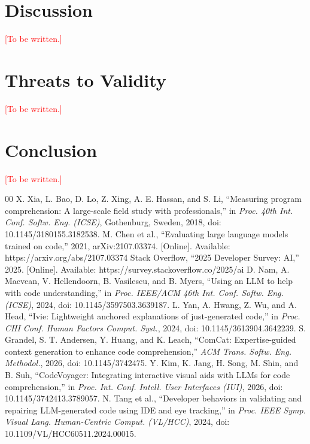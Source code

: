 \documentclass[conference]{IEEEtran}
\newcommand{\todo}[1]{\textcolor{red}{[#1]}}
\begin{document}
\section{Discussion}\label{sec:discussion}
\todo{To be written.}

\section{Threats to Validity}\label{sec:threats}
\todo{To be written.}

\section{Conclusion}\label{sec:conclusion}
\todo{To be written.}

\begin{thebibliography}{00}
 X. Xia, L. Bao, D. Lo, Z. Xing, A. E. Hassan, and S. Li, ``Measuring program comprehension: A large-scale field study with professionals,'' in \textit{Proc. 40th Int. Conf. Softw. Eng. (ICSE)}, Gothenburg, Sweden, 2018, doi: 10.1145/3180155.3182538.
 M. Chen et al., ``Evaluating large language models trained on code,'' 2021, arXiv:2107.03374. [Online]. Available: https://arxiv.org/abs/2107.03374
 Stack Overflow, ``2025 Developer Survey: AI,'' 2025. [Online]. Available: https://survey.stackoverflow.co/2025/ai
 D. Nam, A. Macvean, V. Hellendoorn, B. Vasilescu, and B. Myers, ``Using an LLM to help with code understanding,'' in \textit{Proc. IEEE/ACM 46th Int. Conf. Softw. Eng. (ICSE)}, 2024, doi: 10.1145/3597503.3639187.
 L. Yan, A. Hwang, Z. Wu, and A. Head, ``Ivie: Lightweight anchored explanations of just-generated code,'' in \textit{Proc. CHI Conf. Human Factors Comput. Syst.}, 2024, doi: 10.1145/3613904.3642239.
 S. Grandel, S. T. Andersen, Y. Huang, and K. Leach, ``ComCat: Expertise-guided context generation to enhance code comprehension,'' \textit{ACM Trans. Softw. Eng. Methodol.}, 2026, doi: 10.1145/3742475.
 Y. Kim, K. Jang, H. Song, M. Shin, and B. Suh, ``CodeVoyager: Integrating interactive visual aids with LLMs for code comprehension,'' in \textit{Proc. Int. Conf. Intell. User Interfaces (IUI)}, 2026, doi: 10.1145/3742413.3789057.
 N. Tang et al., ``Developer behaviors in validating and repairing LLM-generated code using IDE and eye tracking,'' in \textit{Proc. IEEE Symp. Visual Lang. Human-Centric Comput. (VL/HCC)}, 2024, doi: 10.1109/VL/HCC60511.2024.00015.

\end{thebibliography}
\end{document}
